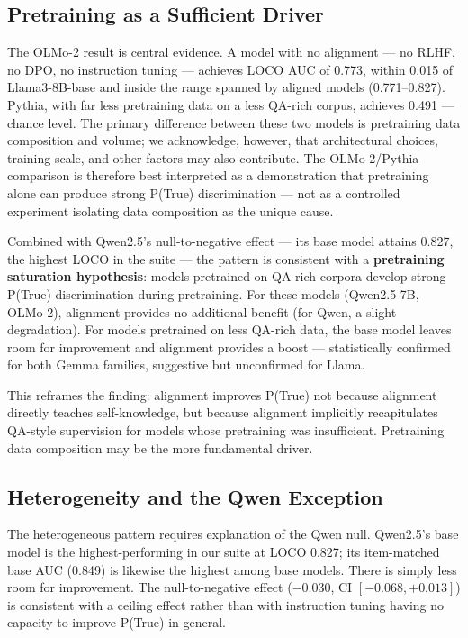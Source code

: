 \documentclass[11pt]{article}
\begin{document}
\subsection{Pretraining as a Sufficient Driver}

The OLMo-2 result is central evidence. A model with no alignment --- no RLHF, no DPO, no instruction tuning --- achieves LOCO AUC of 0.773, within 0.015 of Llama3-8B-base and inside the range spanned by aligned models (0.771--0.827). Pythia, with far less pretraining data on a less QA-rich corpus, achieves 0.491 --- chance level. The primary difference between these two models is pretraining data composition and volume; we acknowledge, however, that architectural choices, training scale, and other factors may also contribute. The OLMo-2/Pythia comparison is therefore best interpreted as a demonstration that pretraining alone can produce strong P(True) discrimination --- not as a controlled experiment isolating data composition as the unique cause.

Combined with Qwen2.5's null-to-negative effect --- its base model attains 0.827, the highest LOCO in the suite --- the pattern is consistent with a \textbf{pretraining saturation hypothesis}: models pretrained on QA-rich corpora develop strong P(True) discrimination during pretraining. For these models (Qwen2.5-7B, OLMo-2), alignment provides no additional benefit (for Qwen, a slight degradation). For models pretrained on less QA-rich data, the base model leaves room for improvement and alignment provides a boost --- statistically confirmed for both Gemma families, suggestive but unconfirmed for Llama.

This reframes the \citet{kadavath2022} finding: alignment improves P(True) not because alignment directly teaches self-knowledge, but because alignment implicitly recapitulates QA-style supervision for models whose pretraining was insufficient. Pretraining data composition may be the more fundamental driver.

\subsection{Heterogeneity and the Qwen Exception}

The heterogeneous pattern requires explanation of the Qwen null. Qwen2.5's base model is the highest-performing in our suite at LOCO 0.827; its item-matched base AUC (0.849) is likewise the highest among base models. There is simply less room for improvement. The null-to-negative effect ($-0.030$, CI $[-0.068, +0.013]$) is consistent with a ceiling effect rather than with instruction tuning having no capacity to improve P(True) in general.
\end{document}
